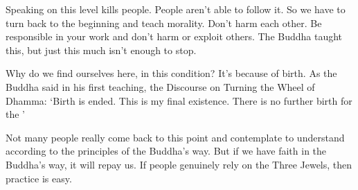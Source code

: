 Speaking on this level kills people. People aren't able to follow it. So we have to turn back to the beginning and teach morality. Don't harm each other. Be responsible in your work and don't harm or exploit others. The Buddha taught this, but just this much isn't enough to stop. 

Why do we find ourselves here, in this condition? It's because of birth. As the Buddha said in his first teaching, the Discourse on Turning the Wheel of Dhamma: `Birth is ended. This is my final existence. There is no further birth for the ' 

Not many people really come back to this point and contemplate to understand according to the principles of the Buddha's way. But if we have faith in the Buddha's way, it will repay us. If people genuinely rely on the Three Jewels, then practice is easy.
